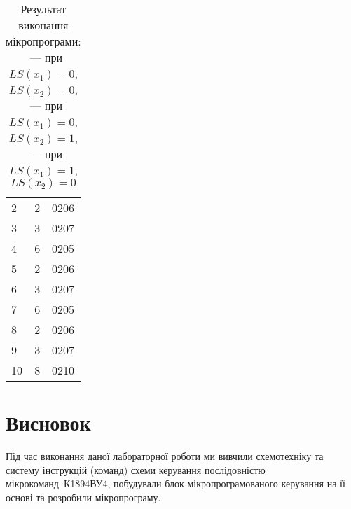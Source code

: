 \documentclass[a4paper,oneside,DIV=12,12pt,headings=normal]{scrartcl}
\begin{document}
\begin{table}[!htbp]
\begin{subtable}[t]{0.31\linewidth}
\begin{tabular}{*{3}{n{3em}}}
							2  & 2  & 0206 \\
							3  & 3  & 0207 \\
							4  & 6  & 0205 \\
							5  & 2  & 0206 \\
							6  & 3  & 0207 \\
							7  & 6  & 0205 \\
							8  & 2  & 0206 \\
							9  & 3  & 0207 \\
							10 & 8  & 0210 \\
						\bottomrule
					\end{tabular}
					\caption{}
					\label{subtab:mp-res-ls10}
				\end{subtable}
				\caption{Результат виконання мікропрограми: ~— при $LS(x_1) = 0$, $LS(x_2) = 0$, ~— при $LS(x_1) = 0$, $LS(x_2) = 1$, ~— при $LS(x_1) = 1$, $LS(x_2) = 0$}
			\end{table}

		\section{Висновок}
			Під час виконання даної лабораторної роботи ми вивчили схемотехніку та систему інструкцій (команд) схеми керування послідовністю мікрокоманд~К1894ВУ4, побудували блок мікропрограмованого керування на її основі та розробили мікропрограму.
\end{document}
